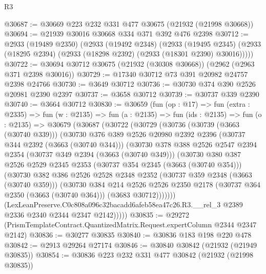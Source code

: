 \begin{lexlean}{R3}
\begin{coremodule}
@30687 := @30669 @223 @232 @331 @477 @30675 (@21932 (@21998 @30668))
@30694 := @21939 @30016 @30668 @334 @371 @392 @476 @2398
@30712 := @2933
    (@19489 @2350)
    (@2933
      (@19492 @2348)
      (@2933
        (@19495 @2345)
        (@2933 (@18295 @2394) (@2933 (@18298 @2392) (@2933 (@18301 @2390) @30016)))))
@30722 := @30694 @30712 @30675 (@21932 (@30308 @30668)) (@2962 (@2963 @371 @2398 @30016))
@30729 := @17340 @30712 @73 @391 @20982 @24757 @2398 @24766
@30730 := @3649 @30712
@30736 := @30730 @374 @390 @2526 @20981 @2390 @2397
@30737 := @3658 @30712
@30739 := @30737 @339 @2390
@30740 := @3664 @30712
@30830 := @30659
    (fun (op : @17) =>
    fun (extra : @2335) =>
    fun (w : @2135) =>
    fun (a : @2135) =>
    fun (ids : @2135) =>
    fun (o : @2135) =>
    @30679
      (@30687
        (@30722
          (@30729
            (@30736
              (@30739 (@3663 (@30740 @339)))
              (@30730
                @376
                @389
                @2526
                @20980
                @2392
                @2396
                (@30737 @344 @2392 (@3663 (@30740 @344)))
                (@30730
                  @378
                  @388
                  @2526
                  @2547
                  @2394
                  @2354
                  (@30737 @349 @2394 (@3663 (@30740 @349)))
                  (@30730
                    @380
                    @387
                    @2526
                    @2529
                    @2345
                    @2353
                    (@30737 @354 @2345 (@3663 (@30740 @354)))
                    (@30730
                      @382
                      @386
                      @2526
                      @2528
                      @2348
                      @2352
                      (@30737 @359 @2348 (@3663 (@30740 @359)))
                      (@30730
                        @384
                        @214
                        @2526
                        @2526
                        @2350
                        @2178
                        (@30737 @364 @2350 (@3663 (@30740 @364)))
                        (@3683 @30712)))))))
            (LexLeanPreserve.C0c808a096c32bacadd6afeb58ea47c26.R3.__rel_3
              @2389
              @2336
              @2340
              @2344
              @2347
              @2142)))))
@30835 := @29272 (PrismTemplateContract.QuantizedMatrix.Request.expertColumn @2344 @2347 @2142)
@30836 := @30277 @30835
@30840 := @30836 @183 @198 @220 @478
@30842 := @2913 @29264 @27174
@30846 := @30840 @30842 (@21932 (@21949 @30835))
@30854 := @30836 @223 @232 @331 @477 @30842 (@21932 (@21998 @30835))

\end{coremodule}
\end{lexlean}
